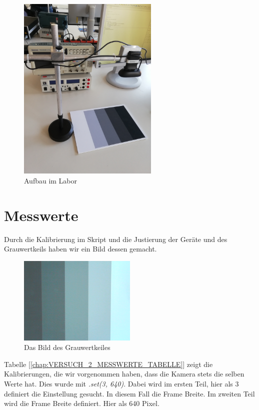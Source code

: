 \documentclass[12pt, oneside, a4paper, \docLanguage]{report}
\begin{document}
\begin{figure}[hbt!]
	\centering\small
	\includegraphics[width=0.6\textwidth]{media/aufbau.jpg}
	\caption{Aufbau im Labor}
	\label{fig:Aufbau im Labor}
\end{figure}
\newpage
\section{Messwerte}
\label{chap:VERSUCH_1_MESSWERTE}

Durch die Kalibrierung im Skript und die Justierung der Geräte und des Grauwertkeils haben wir ein Bild dessen gemacht.

\begin{figure}[hbt!]
	\centering\small
	\includegraphics[width=0.5\textwidth]{../data/Versuch1a.png}
	\caption{Das Bild des Grauwertkeiles}
	\label{fig:Das Bild des Grauwertkeiles}
\end{figure}
\label{chap:VERSUCH_2_MESSWERTE_TABELLE}
Tabelle [\ref{chap:VERSUCH_2_MESSWERTE_TABELLE}] zeigt die Kalibrierungen, die wir vorgenommen haben, dass die Kamera stets die selben Werte hat.
Dies wurde mit \textit{.set(3, 640)}. Dabei wird im ersten Teil, hier als 3 definiert die Einstellung gesucht. In diesem Fall die Frame Breite. Im zweiten Teil wird die Frame Breite definiert. Hier als 640 Pixel.
\end{document}
